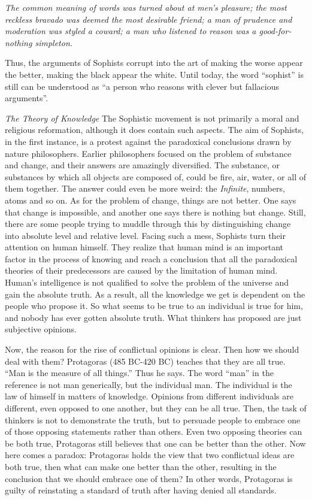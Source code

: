 \documentclass[11pt]{article}
\begin{document}
\textit{The common meaning of words was turned about at men’s pleasure; the most reckless bravado was deemed the most desirable friend; a man of prudence and moderation was styled a coward; a man who listened to reason was a good-for-nothing simpleton.}

Thus, the arguments of Sophists corrupt into the art of making the worse appear the better, making the black appear the white. 
Until today, the word “sophist” is still can be understood as “a person who reasons with clever but fallacious arguments”.
  
\textit{The Theory of Knowledge}
The Sophistic movement is not primarily a moral and religious reformation, although it does contain such aspects. 
The aim of Sophists, in the first instance, is a protest against the paradoxical conclusions drawn by nature philosophers. 
Earlier philosophers focused on the problem of substance and change, and their answers are amazingly diversified. 
The substance, or substances by which all objects are composed of, could be fire, air, water, or all of them together. 
The answer could even be more weird: the \textit{Infinite}, numbers, atoms and so on. 
As for the problem of change, things are not better. 
One says that change is impossible, and another one says there is nothing but change. 
Still, there are some people trying to muddle through this by distinguishing change into absolute level and relative level. 
Facing such a mess, Sophists turn their attention on human himself. 
They realize that human mind is an important factor in the process of knowing and reach a conclusion that all the paradoxical theories of their predecessors are caused by the limitation of human mind. 
Human’s intelligence is not qualified to solve the problem of the universe and gain the absolute truth. 
As a result, all the knowledge we get is dependent on the people who propose it. 
So what seems to be true to an individual is true for him, and nobody has ever gotten absolute truth. 
What thinkers has proposed are just subjective opinions. 

\newline

Now, the reason for the rise of conflictual opinions is clear. 
Then how we should deal with them? 
Protagoras (485 BC-420 BC) teaches that they are all true. 
“Man is the measure of all things.” 
Thus he says. 
The word “man” in the reference is not man generically, but the individual man. 
The individual is the law of himself in matters of knowledge. 
Opinions from different individuals are different, even opposed to one another, but they can be all true. 
Then, the task of thinkers is not to demonstrate the truth, but to persuade people to embrace one of those opposing statements rather than others. 
Even two opposing theories can be both true, Protagoras still believes that one can be better than the other. 
Now here comes a paradox: Protagoras holds the view that two conflictual ideas are both true, then what can make one better than the other, resulting in the conclusion that we should embrace one of them? 
In other words, Protagoras is guilty of reinstating a standard of truth after having denied all standards.
\end{document}

